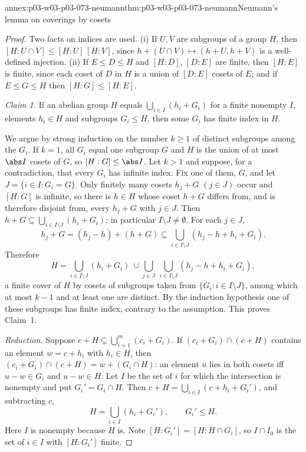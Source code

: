 \begin{annexitem}{annex:p03-w03-p03-073-neumann}{thm:p03-w03-p03-073-neumann}{Neumann's lemma on coverings by cosets}
\begin{proof}
Two facts on indices are used. (i) If \(U,V\) are subgroups of a group
\(H\), then \([H:U\cap V]\le[H:U]\,[H:V]\), since
\(h+(U\cap V)\mapsto(h+U,h+V)\) is a well-defined injection. (ii) If
\(E\le D\le H\) and \([H:D]\), \([D:E]\) are finite, then \([H:E]\) is
finite, since each coset of \(D\) in \(H\) is a union of \([D:E]\) cosets
of \(E\); and if \(E\le G\le H\) then \([H:G]\le[H:E]\).

\emph{Claim 1.} If an abelian group \(H\) equals
\(\bigcup_{i\in I}(h_i+G_i)\) for a finite nonempty \(I\), elements
\(h_i\in H\) and subgroups \(G_i\le H\), then some \(G_i\) has finite
index in \(H\).

We argue by strong induction on the number \(k\ge1\) of distinct subgroups
among the \(G_i\). If \(k=1\), all \(G_i\) equal one subgroup \(G\) and
\(H\) is the union of at most \(\abs I\) cosets of \(G\), so
\([H:G]\le\abs I\). Let \(k>1\) and suppose, for a contradiction, that
every \(G_i\) has infinite index. Fix one of them, \(G\), and let
\(J=\{i\in I:G_i=G\}\). Only finitely many cosets \(h_j+G\)
\((j\in J)\) occur and \([H:G]\) is infinite, so there is \(h\in H\) whose
coset \(h+G\) differs from, and is therefore disjoint from, every
\(h_j+G\) with \(j\in J\). Then
\(h+G\subseteq\bigcup_{i\in I\setminus J}(h_i+G_i)\); in particular
\(I\setminus J\neq\emptyset\). For each \(j\in J\),
\[
 h_j+G=(h_j-h)+(h+G)\subseteq\bigcup_{i\in I\setminus J}(h_j-h+h_i+G_i).
\]
Therefore
\[
 H=\bigcup_{i\in I\setminus J}(h_i+G_i)\ \cup
   \bigcup_{j\in J}\ \bigcup_{i\in I\setminus J}(h_j-h+h_i+G_i),
\]
a finite cover of \(H\) by cosets of subgroups taken from
\(\{G_i:i\in I\setminus J\}\), among which at most \(k-1\) and at least one
are distinct. By the induction hypothesis one of these subgroups has finite
index, contrary to the assumption. This proves Claim~1.

\emph{Reduction.} Suppose \(c+H\subseteq\bigcup_{i=1}^m(c_i+G_i)\). If
\((c_i+G_i)\cap(c+H)\) contains an element \(w=c+h_i\) with \(h_i\in H\),
then \((c_i+G_i)\cap(c+H)=w+(G_i\cap H)\): an element \(u\) lies in both
cosets iff \(u-w\in G_i\) and \(u-w\in H\). Let \(I\) be the set of \(i\)
for which the intersection is nonempty and put \(G_i'=G_i\cap H\). Then
\(c+H=\bigcup_{i\in I}(c+h_i+G_i')\), and subtracting \(c\),
\[
 H=\bigcup_{i\in I}(h_i+G_i'),\qquad G_i'\le H.
\]
Here \(I\) is nonempty because \(H\) is. Note
\([H:G_i']=[H:H\cap G_i]\), so \(I\cap I_0\) is the set of \(i\in I\) with
\([H:G_i']\) finite.


\end{proof}
\end{annexitem}
